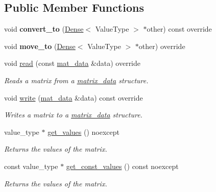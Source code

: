 \subsection*{Public Member Functions}
\begin{DoxyCompactItemize}
\item 
\mbox{\label{classgko_1_1matrix_1_1Ell_ac7ffdfa4fa0b75b47f49a1373995c1c8}} 
void {\bfseries convert\+\_\+to} (\hyperlink{classgko_1_1matrix_1_1Dense}{Dense}$<$ Value\+Type $>$ $\ast$other) const override
\item 
\mbox{\label{classgko_1_1matrix_1_1Ell_aafff71fa45b090208cb6fa29ba495d37}} 
void {\bfseries move\+\_\+to} (\hyperlink{classgko_1_1matrix_1_1Dense}{Dense}$<$ Value\+Type $>$ $\ast$other) override
\item 
void \hyperlink{classgko_1_1matrix_1_1Ell_a2c877d9f7bbc57f97df5ab443954a6fd}{read} (const \hyperlink{structgko_1_1matrix__data}{mat\+\_\+data} \&data) override
\begin{DoxyCompactList}\small\item\em Reads a matrix from a \hyperlink{structgko_1_1matrix__data}{matrix\+\_\+data} structure. \end{DoxyCompactList}\item 
void \hyperlink{classgko_1_1matrix_1_1Ell_afa9148a16a9255003055d8e9156ee941}{write} (\hyperlink{structgko_1_1matrix__data}{mat\+\_\+data} \&data) const override
\begin{DoxyCompactList}\small\item\em Writes a matrix to a \hyperlink{structgko_1_1matrix__data}{matrix\+\_\+data} structure. \end{DoxyCompactList}\item 
value\+\_\+type $\ast$ \hyperlink{classgko_1_1matrix_1_1Ell_a4028e9629a7d96a7a483e6ea4a686a1d}{get\+\_\+values} () noexcept
\begin{DoxyCompactList}\small\item\em Returns the values of the matrix. \end{DoxyCompactList}\item 
const value\+\_\+type $\ast$ \hyperlink{classgko_1_1matrix_1_1Ell_a5bc4d3c67b328b353409e76eb9f70803}{get\+\_\+const\+\_\+values} () const noexcept
\begin{DoxyCompactList}\small\item\em Returns the values of the matrix. \end{DoxyCompactList}\item 

\end{DoxyCompactItemize}
